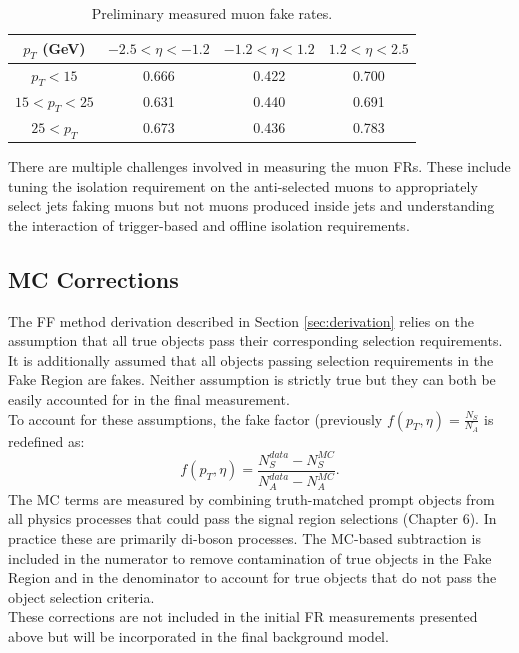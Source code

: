 \begin{table}[htb!]
    \centering
    \begin{tabular}{|c|c|c|c|}
    \hline
    $p_T$ (GeV) & $-2.5<\eta<-1.2$ & $-1.2<\eta<1.2$ & $1.2<\eta<2.5$\\
    \hline
    $p_T<15$ & 0.666 & 0.422 & 0.700\\
    $15<p_T<25$ & 0.631 & 0.440 & 0.691\\
    $25<p_T$ & 0.673 & 0.436 & 0.783\\
    \hline
    \end{tabular}
    \caption{Preliminary measured muon fake rates.}
    \label{tab:muon_frs}
\end{table}

There are multiple challenges involved in measuring the muon FRs. These include tuning the isolation requirement on the anti-selected muons to appropriately select jets faking muons but not muons produced inside jets and understanding the interaction of trigger-based and offline isolation requirements.

\subsection{MC Corrections}\label{sec:mc_corr}
The FF method derivation described in Section \ref{sec:derivation} relies on the assumption that all true objects pass their corresponding selection requirements. It is additionally assumed that all objects passing selection requirements in the Fake Region are fakes. Neither assumption is strictly true but they can both be easily accounted for in the final measurement.\\

To account for these assumptions, the fake factor (previously $f(p_T,\eta)=\frac{N_S}{N_A}$ is redefined as:
\begin{equation*}
    f(p_T,\eta)=\frac{N_S^{data}-N_S^{MC}}{N_A^{data}-N_A^{MC}}.
\end{equation*}
\noindent The MC terms are measured by combining truth-matched prompt objects from all physics processes that could pass the signal region selections (Chapter 6). In practice these are primarily di-boson processes. The MC-based subtraction is included in the numerator to remove contamination of true objects in the Fake Region and in the denominator to account for true objects that do not pass the object selection criteria.\\

These corrections are not included in the initial FR measurements presented above but will be incorporated in the final background model.

